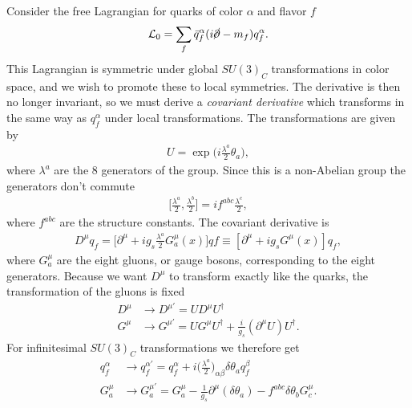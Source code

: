 \documentclass[11pt]{article}
\begin{document}
\begin{multicols}{2}
\begin{flushleft}
Consider the free Lagrangian for quarks of color $\alpha$ and flavor $f$
\begin{align*}
\mathcal{L}_0 = \sum_f \bar{q}_f^{\alpha} (i \cancel{\partial} - m_f)q_f^{\alpha}.
\end{align*}
This Lagrangian is symmetric under global $SU(3)_C$ transformations in color space, and we wish to promote these to local symmetries. The derivative is then no longer invariant, so we must derive a \textit{covariant derivative} which transforms in the same way as $q_f^{\alpha}$ under local transformations. The transformations are given by
\begin{align*}
U = \exp \Big( i \frac{\lambda^a}{2} \theta_a \Big),
\end{align*}
where $\lambda^a$ are the 8 generators of the group. Since this is a non-Abelian group the generators don't commute
\begin{align*}
\Big[ \frac{\lambda^a}{2}, \frac{\lambda^b}{2}
\Big] = i f^{abc} \frac{\lambda^c}{2},
\end{align*}
where $f^{abc}$ are the structure constants. The covariant derivative is
\begin{align*}
D^{\mu} q_f = \Big[ \partial^{\mu} + ig_s \frac{\lambda^a}{2} G^{\mu}_a (x) \Big] qf \equiv [\partial^{\mu} + ig_s G^{\mu} (x)] q_f,
\end{align*}
where $G^{\mu}_a$ are the eight gluons, or gauge bosons, corresponding to the eight generators. Because we want $D^{\mu}$ to transform exactly like the quarks, the transformation of the gluons is fixed
\begin{align*}
D^{\mu} & \rightarrow D^{\mu '} = U D^{\mu} U^{\dagger}\\
G^{\mu} & \rightarrow G^{\mu '} = U G^{\mu} U^{\dagger} + \frac{i}{g_s} (\partial^{\mu} U) U^{\dagger}.
\end{align*}
For infinitesimal $SU(3)_C$ transformations we therefore get
\begin{align*}
q_f^{\alpha} &\rightarrow q_f^{\alpha '} = q_f^{\alpha} + i \Big( \frac{\lambda^a}{2} \Big)_{\alpha \beta} \delta \theta_a q_f^{\beta}\\
G_a^{\mu} & \rightarrow G_a^{\mu '} = G_a^{\mu} - \frac{1}{g_s} \partial^{\mu} (\delta \theta_a) - f^{abc} \delta \theta_b G_c^{\mu}.
\end{align*}
\end{flushleft}


\end{multicols}
\end{document}
